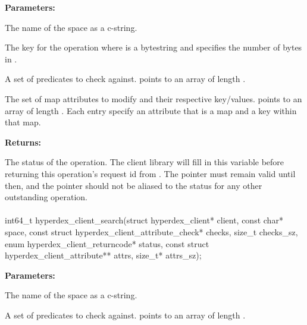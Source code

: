 \noindent\textbf{Parameters:}
\begin{description}[labelindent=\widthof{{\code{mapattrs}, \code{mapattrs\_sz}}},leftmargin=*,noitemsep,nolistsep,align=right]
\item[\code{space}] The name of the space as a c-string.
\item[\code{key}, \code{key\_sz}] The key for the operation where  is a bytestring and  specifies the number of bytes in .
\item[\code{checks}, \code{checks\_sz}] A set of predicates to check against.   points to an array of length .
\item[\code{mapattrs}, \code{mapattrs\_sz}] The set of map attributes to modify and their respective key/values.   points to an array of length .  Each entry specify an attribute that is a map and a key within that map.
\end{description}

\noindent\textbf{Returns:}
\begin{description}[labelindent=\widthof{{\code{status}}},leftmargin=*,noitemsep,nolistsep,align=right]
\item[\code{status}] The status of the operation.  The client library will fill in this variable before returning this operation's request id from .  The pointer must remain valid until then, and the pointer should not be aliased to the status for any other outstanding operation.
\end{description}

\paragraph{}
\label{api:c:search}
\begin{ccode}
int64_t hyperdex_client_search(struct hyperdex_client* client,
                const char* space,
                const struct hyperdex_client_attribute_check* checks, size_t checks_sz,
                enum hyperdex_client_returncode* status,
                const struct hyperdex_client_attribute** attrs, size_t* attrs_sz);
\end{ccode}
\funcdesc 

\noindent\textbf{Parameters:}
\begin{description}[labelindent=\widthof{{\code{checks}, \code{checks\_sz}}},leftmargin=*,noitemsep,nolistsep,align=right]
\item[\code{space}] The name of the space as a c-string.
\item[\code{checks}, \code{checks\_sz}] A set of predicates to check against.   points to an array of length .
\end{description}


